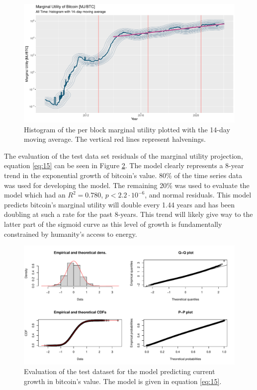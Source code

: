 \documentclass[runningheads]{llncs}
\begin{document}
\begin{figure}
    \includegraphics[width=\textwidth]{BTC Marginal Utility.pdf}
    \caption{Histogram of the per block marginal utility plotted with the 14-day moving average. The vertical red lines represent halvenings.} \label{fig:5}
\end{figure}

The evaluation of the test data set residuals of the marginal utility projection, equation \ref{eq:15} can be seen in Figure \ref{fig:6}.
The model clearly represents a 8-year trend in the exponential growth of bitcoin's value.
80\% of the time series data was used for developing the model.
The remaining 20\% was used to evaluate the model which had an $R^2=0.780$, $p<2.2\cdot10^{-6}$, and normal residuals.
This model predicts bitcoin's marginal utility will double every 1.44 years and has been doubling at such a rate for the past 8-years.
This trend will likely give way to the latter part of the sigmoid curve as this level of growth is fundamentally constrained by humanity's access to energy.

\begin{figure}
    \includegraphics[width=\textwidth]{BTC Marginal Utility Projection Test Fit Evaluation.pdf}
    \caption{Evaluation of the test dataset for the model predicting current growth in bitcoin's value.
        The model is given in equation \ref{eq:15}.} \label{fig:6}
\end{figure}
\end{document}
